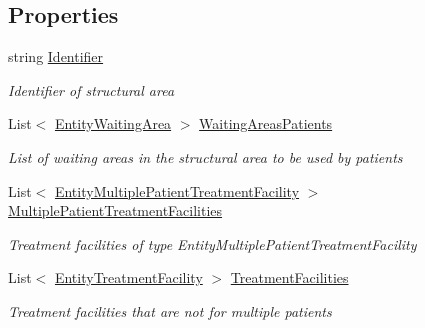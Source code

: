 \subsection*{Properties}
\begin{DoxyCompactItemize}
\item 
string \hyperlink{class_general_health_care_elements_1_1_resource_handling_1_1_structural_area_a4ecbdf7023214bdb03b8b43ecd2fec5f}{Identifier}
\begin{DoxyCompactList}\small\item\em Identifier of structural area \end{DoxyCompactList}\item 
List$<$ \hyperlink{class_general_health_care_elements_1_1_entities_1_1_entity_waiting_area}{Entity\+Waiting\+Area} $>$ \hyperlink{class_general_health_care_elements_1_1_resource_handling_1_1_structural_area_adc31097b95a216a3677a17f2bb42b9c3}{Waiting\+Areas\+Patients}
\begin{DoxyCompactList}\small\item\em List of waiting areas in the structural area to be used by patients \end{DoxyCompactList}\item 
List$<$ \hyperlink{class_general_health_care_elements_1_1_entities_1_1_entity_multiple_patient_treatment_facility}{Entity\+Multiple\+Patient\+Treatment\+Facility} $>$ \hyperlink{class_general_health_care_elements_1_1_resource_handling_1_1_structural_area_a6026e3314be5b4b5525b7a52d0bb789e}{Multiple\+Patient\+Treatment\+Facilities}
\begin{DoxyCompactList}\small\item\em Treatment facilities of type Entity\+Multiple\+Patient\+Treatment\+Facility \end{DoxyCompactList}\item 
List$<$ \hyperlink{class_general_health_care_elements_1_1_entities_1_1_entity_treatment_facility}{Entity\+Treatment\+Facility} $>$ \hyperlink{class_general_health_care_elements_1_1_resource_handling_1_1_structural_area_a61932e45a40e44fa345468a334a82100}{Treatment\+Facilities}
\begin{DoxyCompactList}\small\item\em Treatment facilities that are not for multiple patients \end{DoxyCompactList}\item 

\end{DoxyCompactItemize}
